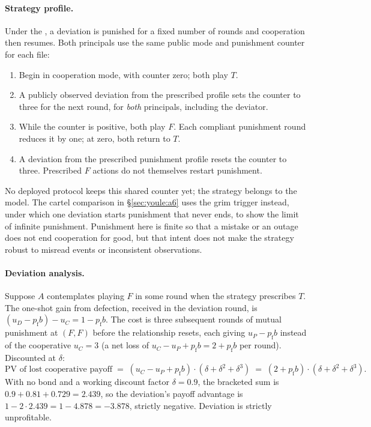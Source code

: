 \documentclass[11pt,a4paper]{article}
\theoremstyle{definition}
\theoremstyle{remark}
\begin{document}
\paragraph{Strategy profile.}
Under the , a deviation is punished for a fixed number
of rounds and cooperation then resumes. Both principals use the same public mode
and punishment counter for each file:
\begin{enumerate}[nosep]
  \item Begin in cooperation mode, with counter zero; both play $T$.
  \item A publicly observed deviation from the prescribed profile sets the
    counter to three for the next round, for \emph{both} principals, including the deviator.
  \item While the counter is positive, both play $F$. Each compliant punishment
    round reduces it by one; at zero, both return to $T$.
  \item A deviation from the prescribed punishment profile resets the counter
    to three. Prescribed $F$ actions do not themselves restart punishment.
\end{enumerate}

No deployed protocol keeps this shared counter yet; the strategy belongs to
the model. The cartel comparison in \S\ref{sec:youle:a6} uses the
grim trigger instead, under which one deviation starts punishment that
never ends, to show the limit of infinite punishment. Punishment here is finite
so that a mistake or an outage does not end cooperation for good, but that
intent does not make the strategy robust to misread events or inconsistent
observations.

\paragraph{Deviation analysis.}
Suppose $A$ contemplates playing $F$ in some round when the strategy prescribes $T$. The one-shot gain from defection, received in the deviation round, is $(u_D - p_{\mathrm f}b) - u_C = 1 - p_{\mathrm f}b$. The cost is three subsequent rounds of mutual punishment at $(F,F)$ before the relationship resets, each giving $u_P - p_{\mathrm f}b$ instead of the cooperative $u_C = 3$ (a net loss of $u_C - u_P + p_{\mathrm f}b = 2 + p_{\mathrm f}b$ per round). Discounted at $\delta$:
\[
\text{PV of lost cooperative payoff} \;=\; (u_C - u_P + p_{\mathrm f}b) \cdot (\delta + \delta^2 + \delta^3) \;=\; (2 + p_{\mathrm f}b) \cdot (\delta + \delta^2 + \delta^3).
\]
With no bond and a working discount factor $\delta = 0.9$, the bracketed sum is $0.9 + 0.81 + 0.729 = 2.439$, so the deviation's payoff advantage is $1 - 2 \cdot 2.439 = 1 - 4.878 = -3.878$, strictly negative. Deviation is strictly unprofitable.
\end{document}
